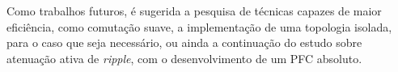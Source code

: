 \documentclass[
        12pt,
        openany, %
        oneside, %
        a4paper,			
        english,			
        brazil
        ]{abntbibufjf}
\begin{document}
Como trabalhos futuros, é sugerida a pesquisa de técnicas capazes de maior eficiência, como comutação suave, a implementação de uma topologia isolada, para o caso que seja necessário, ou ainda a continuação do estudo sobre atenuação ativa de \textit{ripple}, com o desenvolvimento de um PFC absoluto.





\end{document}
